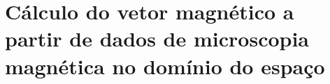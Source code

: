 \documentclass[dsc]{on}     %
\begin{document}
\part{Cálculo do vetor magnético a partir de dados de microscopia magnética no domínio do espaço}
%
%   
%
%
%


\backmatter

%
%

  
\end{document}
